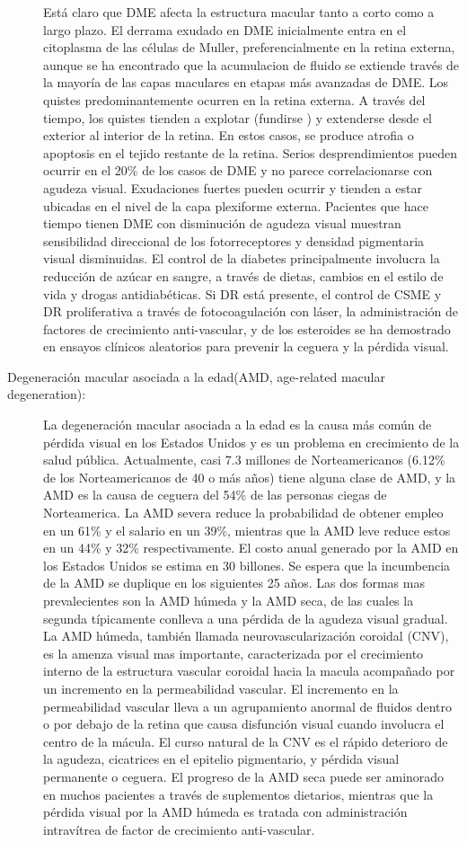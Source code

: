 \begin{description}
Está claro que DME afecta la estructura macular tanto a corto como a largo plazo. El derrama exudado en DME inicialmente entra en el citoplasma de las células de Muller, preferencialmente en la retina externa, aunque se ha encontrado que la acumulacion de fluido se extiende través de la mayoría de las capas maculares en etapas más avanzadas de DME. Los quistes predominantemente ocurren en la retina externa. A través del tiempo, los quistes tienden a explotar (fundirse ) y extenderse desde el exterior al interior de la retina. En estos casos, se produce atrofia o apoptosis en el tejido restante de la retina. Serios desprendimientos pueden ocurrir en el 20\% de los casos de DME y no parece correlacionarse con agudeza visual. Exudaciones fuertes pueden ocurrir y tienden a estar ubicadas en el nivel de la capa plexiforme externa. Pacientes que hace tiempo tienen DME con disminución de agudeza visual muestran sensibilidad direccional de los fotorreceptores y densidad pigmentaria visual disminuidas.
El control de la diabetes principalmente involucra la reducción de azúcar en sangre, a través de dietas, cambios en el estilo de vida y drogas antidiabéticas. Si DR está presente,  el control de CSME y DR proliferativa a través de fotocoagulación con láser, la administración de factores de crecimiento anti-vascular, y de los esteroides se ha demostrado en ensayos clínicos aleatorios para prevenir la ceguera y la pérdida visual.
    \item[Degeneración macular asociada a la edad(AMD, age-related macular degeneration):]La degeneración macular asociada a la edad es la causa más común de pérdida visual en los Estados Unidos y es un problema en crecimiento de la salud pública. Actualmente, casi 7.3 millones de Norteamericanos (6.12\% de los Norteamericanos de 40 o más años) tiene alguna clase de AMD, y la AMD es la causa de ceguera del 54\% de las personas ciegas de Norteamerica. La AMD severa reduce la probabilidad de obtener empleo en un 61\% y el salario en un 39\%, mientras que la AMD leve reduce estos en un 44\% y 32\% respectivamente. El costo anual generado por la AMD en los Estados Unidos se estima en 30 billones. Se espera que la incumbencia de la AMD se duplique en los siguientes 25 años. Las dos formas mas prevalecientes son la AMD húmeda y la AMD seca, de las cuales la segunda típicamente conlleva a una pérdida de la agudeza visual gradual. La AMD húmeda, también llamada neurovascularización coroidal (CNV), es la amenza visual mas importante, caracterizada por el crecimiento interno de la estructura vascular coroidal hacia la macula acompañado por un incremento en la permeabilidad vascular. El incremento en la permeabilidad vascular lleva a un agrupamiento anormal de fluidos dentro o por debajo de la retina que causa disfunción visual cuando involucra el centro de la mácula. El curso natural de la CNV es el rápido deterioro de la agudeza, cicatrices en el epitelio pigmentario, y pérdida visual permanente o ceguera. El progreso de la AMD seca puede ser aminorado en muchos pacientes a través de suplementos dietarios, mientras que la pérdida visual por la AMD húmeda es tratada con administración intravítrea de factor de crecimiento anti-vascular.
     

\end{description}
